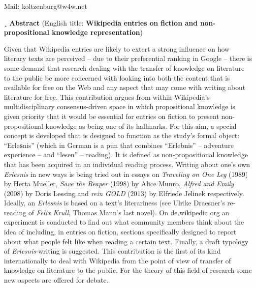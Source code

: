 \documentclass[fontsize=12pt]{scrartcl}
\begin{document}
\begin{titlepage}
\begin{center}
Mail: \flq koltzenburg@w4w.net\frq
\end{center}
\null
\newpage
\thispagestyle{empty}
\end{titlepage}

\newpage
\thispagestyle{empty}
\singlespacing
¸\newline
\newline
\newline
\newline
\newline
\newline
\newline
\textbf{Abstract}
(English title: \textbf{Wikipedia entries on fiction and non-propositional knowledge representation})

Given that Wikipedia entries are likely to extert a strong influence on how literary texts are perceived -- due to their preferential ranking in Google -- there is some demand that research dealing with the transfer of know\-ledge on li\-te\-ra\-tur\-e to the public be more concerned with looking into both the content that is available for free on the Web and any aspect that may come with writing about li\-te\-ra\-tur\-e for free. This contribution argues from within Wi\-ki\-pe\-dia's multidisciplinary consensus-driven space in which propositional know\-ledge is given priority that it would be essential for entries on fiction to present non-propositional know\-ledge as being one of its hallmarks. For this aim, a special concept is developed that is designed to function as the study's formal object: "`Erle\textbf{s}nis"' (which in German is a pun that combines "`Erlebnis"' -- adventure experience -- and "`lesen"' -- reading). It is defined as non-propositional know\-ledge that has been acquired in an individual reading process. Writing about one's own \textit{Erlesnis} in new ways is being tried out in essays on \textit{Traveling on One Leg} (1989) by Herta Mueller, \textit{Save the Reaper} (1998) by Alice Munro, \textit{Alfred and Emily} (2008) by Doris Lessing and \textit{rein GOLD} (2013) by Elfriede Jelinek respectively. Ideally, an \textit{Erlesnis} is based on a text's literariness (see Ulrike Draesner's re-reading of \textit{Felix Krull}, Thomas Mann's last novel). On de.wikipedia.org an experiment is conducted to find out what community members think about the idea of including, in entries on fiction, sections specifically designed to report about what people felt like when reading a certain text. Finally, a draft typology of \textit{Erlesnis}-writing is suggested. This contribution is the first of its kind internationally to deal with Wi\-ki\-pe\-dia from the point of view of transfer of know\-ledge on li\-te\-ra\-tur\-e to the public. For the theory of this field of research some new aspects are offered for debate.
\end{document}
